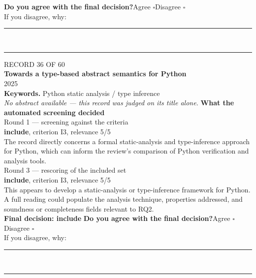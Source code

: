 \documentclass[11pt,a4paper]{article}
\begin{document}
{\small\textbf{Do you agree with the final decision?}\quad{}Agree $\square$\qquad{}Disagree $\square$}\\[1mm]
{\footnotesize\color{soft}If you disagree, why:}\\[1mm]
\color{rule}\rule{\linewidth}{0.3pt}\\[3mm]\rule{\linewidth}{0.3pt}\color{black}
\clearpage
{\color{soft}\footnotesize RECORD 36 OF 60}\\[1mm]
{\large\bfseries Towards a type-based abstract semantics for Python}\\[1.5mm]
{\color{soft}\small 2025}\\[2mm]
{\small\textbf{Keywords.} Python static analysis / type inference}\\[2mm]
{\small\itshape\color{soft}No abstract available --- this record was judged on its title alone.}
\vspace{3mm}
\vspace{2.5mm}
{\small\textbf{What the automated screening decided}}\\[2mm]
{\footnotesize\color{soft}Round 1 --- screening against the criteria}\\[0.5mm]
{\small\textbf{include}, criterion I3, relevance 5/5}\\[0.5mm]
{\small The record directly concerns a formal static-analysis and type-inference approach for Python, which can inform the review's comparison of Python verification and analysis tools.}\\[2.5mm]
{\footnotesize\color{soft}Round 3 --- rescoring of the included set}\\[0.5mm]
{\small\textbf{include}, criterion I3, relevance 5/5}\\[0.5mm]
{\small This appears to develop a static-analysis or type-inference framework for Python. A full reading could populate the analysis technique, properties addressed, and soundness or completeness fields relevant to RQ2.}\\[2.5mm]
{\small\textbf{Final decision: include}}
\vspace{2mm}
{\small\textbf{Do you agree with the final decision?}\quad{}Agree $\square$\qquad{}Disagree $\square$}\\[1mm]
{\footnotesize\color{soft}If you disagree, why:}\\[1mm]
\color{rule}\rule{\linewidth}{0.3pt}\\[3mm]\rule{\linewidth}{0.3pt}\color{black}
\end{document}
